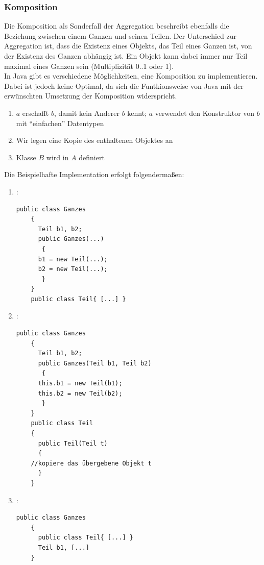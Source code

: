 \documentclass[a4paper,10pt,DIV9, BCOR12mm, oneside,openright,openbib]{scrreprt}
\theoremstyle{definition}
\theoremstyle{plain}
\begin{document}
\subsubsection{Komposition}
Die Komposition als Sonderfall der Aggregation beschreibt ebenfalls die Beziehung zwischen einem Ganzen und seinen Teilen. Der Unterschied zur Aggregation ist, dass die Existenz eines Objekts, das Teil eines Ganzen ist, von der Existenz des Ganzen abhängig ist. Ein Objekt kann dabei immer nur Teil maximal eines Ganzen sein (Multiplizität 0..1 oder 1). \\
In Java gibt es verschiedene Möglichkeiten, eine Komposition zu implementieren. Dabei ist jedoch keine Optimal, da sich die Funtkionsweise von Java mit der erwünschten Umsetzung der Komposition widerspricht.
\begin{enumerate}
 \item $a$ erschafft $b$, damit kein Anderer $b$ kennt; $a$ verwendet den Konstruktor von $b$ mit ``einfachen'' Datentypen
 \item Wir legen eine Kopie des enthaltenen Objektes an
 \item Klasse $B$ wird in $A$ definiert
\end{enumerate}
Die Beispielhafte Implementation erfolgt folgendermaßen:
\begin{enumerate}
 \item :
  \begin{lstlisting}[caption=Implementierung durch Erschaffung des Teils vom Ganzen]
    public class Ganzes
    {
      Teil b1, b2;
      public Ganzes(...)
       {
	  b1 = new Teil(...);
	  b2 = new Teil(...);
       }
    }
    public class Teil{ [...] }
  \end{lstlisting}
 \item :
  \begin{lstlisting}[caption=Implementierung durch Anlegen einer Kopie]
    public class Ganzes
    {
      Teil b1, b2;
      public Ganzes(Teil b1, Teil b2)
       {
	  this.b1 = new Teil(b1);
	  this.b2 = new Teil(b2);
       }
    }
    public class Teil
    {
      public Teil(Teil t)
      {
	//kopiere das übergebene Objekt t
      }
    }
  \end{lstlisting}
 \item :
  \begin{lstlisting}[caption=Implementierung durch enthaltene Klassen]
    public class Ganzes
    {
      public class Teil{ [...] }
      Teil b1, [...]
    }
  \end{lstlisting}
\end{enumerate}
\end{document}
